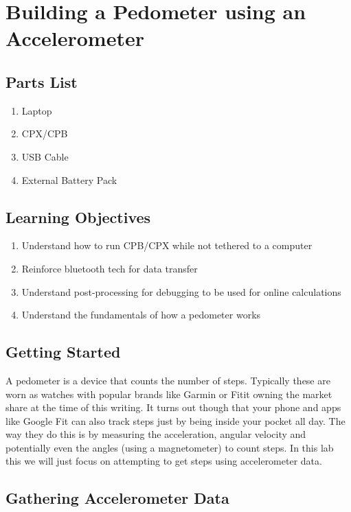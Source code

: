 \newpage

\section{Building a Pedometer using an Accelerometer}
\label{s:pendulum}

\subsection{Parts List}

\begin{enumerate}[itemsep=-5pt]
\item Laptop
\item CPX/CPB
\item USB Cable
\item External Battery Pack
\end{enumerate}

\subsection{Learning Objectives}
\begin{enumerate}[itemsep=-5pt]
\item Understand how to run CPB/CPX while not tethered to a computer
\item Reinforce bluetooth tech for data transfer
\item Understand post-processing for debugging to be used for online calculations
\item Understand the fundamentals of how a pedometer works
\end{enumerate}

\subsection{Getting Started}

A pedometer is a device that counts the number of steps. Typically these are worn as watches with popular brands like Garmin or Fitit owning the market share at the time of this writing. It turns out though that your phone and apps like Google Fit can also track steps just by being inside your pocket all day. The way they do this is by measuring the acceleration, angular velocity and potentially even the angles (using a magnetometer) to count steps. In this lab this we will just focus on attempting to get steps using accelerometer data. 

\subsection{Gathering Accelerometer Data}

